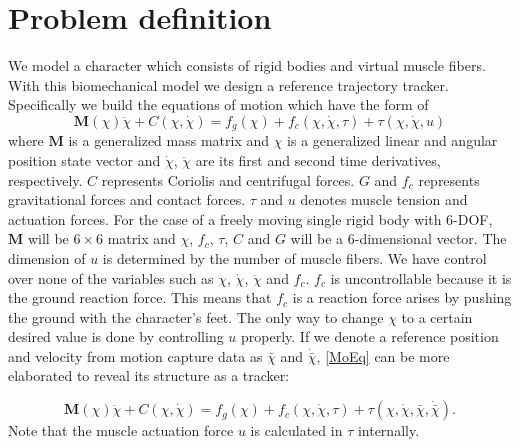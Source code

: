 \documentclass[a4paper,10pt]{article}
\begin{document}

\pagebreak

\section{Problem definition}

We model a character which consists of rigid bodies and virtual muscle fibers.
With this biomechanical model we design a reference trajectory tracker.
Specifically we build the equations of motion which have the
form of
\begin{equation}\label{MoEq}
\mathbf{M}(\chi)\ddot\chi + C(\chi,\dot\chi ) = f_g(\chi) + f_c(\chi, \dot\chi, \tau ) + \tau (\chi, \dot\chi, u)
\end{equation}
where $\mathbf{M}$ is a generalized mass matrix and $\chi$ is a generalized
linear and angular position
state vector and $\dot\chi$, $\ddot\chi$ are its first and second time derivatives,
respectively. $C$ represents Coriolis and centrifugal forces.
$G$ and $f_c$ represents gravitational forces and contact forces.
$\tau$ and $u$ denotes muscle tension and actuation forces.
For the case of a freely moving single
rigid body with 6-DOF, $\mathbf{M}$ will be $6\times 6$ matrix and $\chi$,
$f_c$, $\tau$, $C$ and $G$ will be a 6-dimensional vector. The dimension of $u$ is
determined by the number of muscle fibers. We have control
over none of the variables such as $\chi$, $\dot\chi$, $\ddot\chi$ and $f_c$.
$f_c$ is uncontrollable because it is the ground reaction force. This means that
$f_c$ is a reaction force arises by pushing the ground with the character's feet.
The only way to change $\chi$ to a certain desired value is done by controlling $u$
properly. If we denote a reference position and velocity from motion capture data
as $\bar\chi$ and $\dot{\bar\chi}$, \eqref{MoEq} can be more elaborated
to reveal its structure as a tracker:

\begin{equation}\label{MoEq2}
\mathbf{M}(\chi)\ddot\chi + C(\chi,\dot\chi ) = f_g(\chi) + f_c(\chi, \dot\chi, \tau ) + \tau (\chi, \dot\chi, \bar\chi, \dot{\bar\chi}).
\end{equation}
Note that the muscle actuation force $u$ is calculated in $\tau$ internally. 
\end{document}
